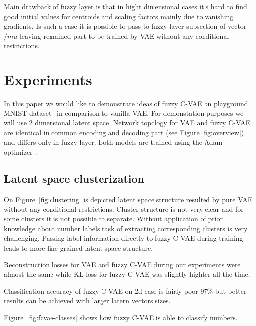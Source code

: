 \documentclass[runningheads]{llncs}
\begin{document}
Main drawback of fuzzy layer is that in hight dimensional cases it's hard to find good initial values for centroids and scaling factors mainly due to vanishing gradients.
Is such a case it is possible to pass to fuzzy layer subsection of vector $/mu$ leaving remained part to be trained by VAE without any conditional restrictions. 


\section{Experiments}

In this paper we would like to demonstrate ideas of fuzzy C-VAE on playground MNIST dataset~\cite{deng2012mnist} in comparison to vanilla VAE.
For demonstation purposes we will use 2 dimensional latent space.
Network topology for VAE and fuzzy C-VAE are identical in common encoding and decoding part (see Figure \ref{fig:overview}) and differs only in fuzzy layer.
Both models are trained using the Adam optimizer~\cite{kingma2017adam}.

\subsection{Latent space clusterization}

On Figure~\ref{fig:clustering} is depicted latent space structure resulted by pure VAE without any conditional restrictions.
Cluster structure is not very clear and for some clusters it is not possible to separate.
Without application of prior knowledge about number labels task of extracting corresponding clusters is very challenging.
Passing label information directly to fuzzy C-VAE during training leads to more fine-grained latent space structure.

Reconstruction losses for VAE and fuzzy C-VAE during our experiments were almost the same while KL-loss for fuzzy C-VAE was slightly highter all the time.

Classification accuracy of fuzzy C-VAE on 2d case is fairly poor 97\% but better results can be achieved with larger latern vectors sizes.

Figure~\ref{fig:fcvae-classes} shows how fuzzy C-VAE is able to classify numbers.
\end{document}
